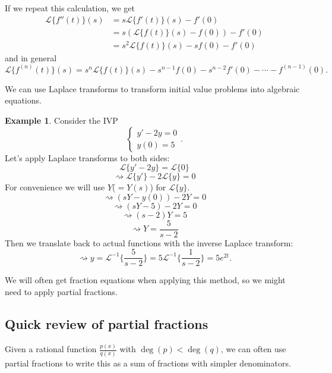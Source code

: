 \documentclass[12pt]{amsart}
\numberwithin{equation}{section}
\theoremstyle{plain} %
\newcommand{\rsa}{\rightsquigarrow}
\theoremstyle{definition}
\newtheorem{ex}[equation]{Example}
\theoremstyle{remark}
\newcommand{\LA}[1]{\mathcal{L}\{ #1 \}}
\newcommand{\LAi}[1]{\mathcal{L}^{-1}\{ #1 \}}
\begin{document}
If we repeat this calculation, we get
\begin{align*}
\LA{f''(t)}(s) &= s \LA{f'(t)}(s) - f'(0)\\&= s( \LA{f(t)}(s) - f(0) ) - f'(0)\\
&= s^2 \LA{f(t)}(s) - s f(0) - f'(0)
\end{align*}
and in general
\[ \LA{f^{(n)}(t)}(s) = s^n \LA{f(t)}(s) - s^{n-1} f(0) - s^{n-2} f'(0) - \cdots - f^{(n-1)}(0).\]

We can use Laplace transforms to transform initial value problems into algebraic equations.

\begin{ex} Consider the IVP
\[ \begin{cases} y' - 2y = 0 \\ y(0) = 5\end{cases}.\]
Let's apply Laplace transforms to both sides:
\[ \LA{ y' - 2y} = \LA{0}\]
\[\rsa \LA{y'} - 2 \LA{y} = 0\]
For convenience we will use $Y$($=Y(s)$) for $\LA{y}$.
\[ \rsa (sY - y(0)) - 2 Y =0\]
\[ \rsa (sY - 5) - 2 Y =0\]
\[ \rsa (s-2)Y = 5\]
\[ \rsa Y = \frac{5}{s-2}\]
Then we translate back to actual functions with the inverse Laplace transform:
\[ \rsa y = \LAi{\frac{5}{s-2}} = 5 \LAi{\frac{1}{s-2}} = 5 e^{2t}.\]
\end{ex}

We will often get fraction equations when applying this method, so we might need to apply partial fractions.

\subsection*{Quick review of partial fractions}
Given a rational function $\frac{p(x)}{q(x)}$ with $\deg(p)<\deg(q)$, we can often use partial fractions to write this as a sum of fractions with simpler denominators.
\end{document}
